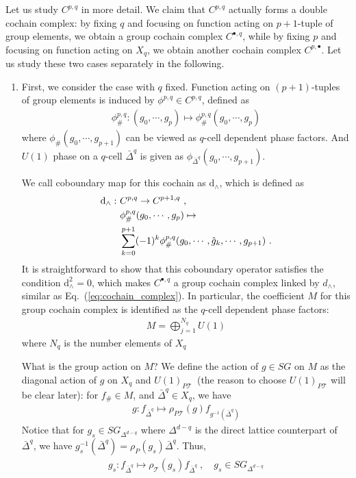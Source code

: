 \documentclass[%
 reprint,
 amsmath,amssymb,
 aps,pra,
]{revtex4-1}
\newcommand{\dd}{\mathrm{d}} %
\newcommand{\TT}{\mathcal{T}} %
\begin{document}
Let us study $C^{p,q}$ in more detail.
We claim that $C^{p,q}$ actually forms a double cochain complex: by fixing $q$ and focusing on function acting on $p+1$-tuple of group elements, we obtain a group cochain complex $C^{\bullet,q}$, while by fixing $p$ and focusing on function acting on $X_q$, we obtain another cochain complex $C^{p,\bullet}$.
Let us study these two cases separately in the following.
\begin{enumerate}
  \item First, we consider the case with $q$ fixed. 
    Function acting on $(p+1)$-tuples of group elements is induced by $\phi^{p,q}\in C^{p,q}$, defined as
    \begin{align}
      \phi^{p,q}_\#:(g_0,\cdots,g_{p})\mapsto \phi^{p,q}_{\#}(g_0,\cdots,g_{p})
      \label{}
    \end{align}
    where $\phi_{\#}(g_0,\cdots,g_{p+1})$ can be viewed as $q$-cell dependent phase factors.
    And $U(1)$ phase on a $q$-cell $\bar{\Delta}^q$ is given as $\phi_{\bar{\Delta}^q}(g_0,\cdots,g_{p+1})$.

    We call coboundary map for this cochain as $\dd_\wedge$, which is defined as
    \begin{align}
      \dd_\wedge:~& C^{p,q}\rightarrow C^{p+1,q}~,\notag\\
      &\phi_{\#}^{p,q}(g_0,\cdots,g_{p})\mapsto\notag\\
      &\sum_{k=0}^{p+1}(-1)^k\phi^{p,q}_{\#}(g_0,\cdots,\hat{g}_k,\cdots,g_{p+1})~.
      \label{eq:double_complex_vertical_d}
    \end{align}
    It is straightforward to show that this coboundary operator satisfies the condition $\dd_\wedge^2=0$, which makes $C^{\bullet,q}$ a group cochain complex linked by $d_\wedge$, similar as Eq.~(\ref{eq:cochain_complex}).
    In particular, the coefficient $M$ for this group cochain complex is identified as the $q$-cell dependent phase factors:
    \begin{align}
      M=\bigoplus_{j=1}^{N_q} U(1)
      \label{eq:eqv_cohomology_coeff}
    \end{align}
    where $N_q$ is the number elements of $X_q$

    What is the group action on $M$?
    We define the action of $g\in SG$ on $M$ as the diagonal action of $g$ on $X_q$ and $U(1)_{P\TT}$~(the reason to choose $U(1)_{P\TT}$ will be clear later): for $f_{\#}\in M$, and $\bar{\Delta}^q\in X_q$, we have
    \begin{align}
      g:f_{\bar{\Delta}^q}\mapsto \rho_{P\TT}(g)f_{g^{-1}(\bar{\Delta}^q)}
      \label{eq:eqv_cohomology_coeff_sym_act}
    \end{align}
    Notice that for $g_s\in SG_{\Delta^{d-q}}$ where $\Delta^{d-q}$ is the direct lattice counterpart of $\bar{\Delta}^q$, we have $g_s^{-1}(\bar{\Delta}^q)=\rho_P(g_s)\bar{\Delta}^q$.
    Thus, 
    \begin{align}
      g_s:f_{\bar{\Delta}^q}\mapsto\rho_\TT(g_s)f_{\bar{\Delta}^q}~,\quad g_s\in SG_{\Delta^{d-q}}
      \label{eq:eqv_cohomology_local_coeff_sym_act}
    \end{align}


\end{enumerate}
\end{document}
